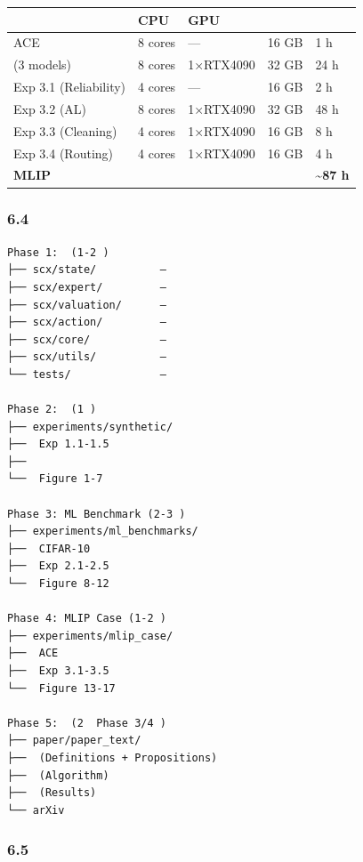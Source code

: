 \documentclass[
  12pt,
]{article}
\begin{document}
\begin{longtable}[]{@{}lllll@{}}
\toprule\noalign{}
 & CPU & GPU &  &  \\
\midrule\noalign{}
\endhead
\bottomrule\noalign{}
\endlastfoot
ACE  & 8 cores & --- & 16 GB & 1 h \\
 (3 models) & 8 cores & 1×RTX4090 & 32 GB & 24 h \\
Exp 3.1 (Reliability) & 4 cores & --- & 16 GB & 2 h \\
Exp 3.2 (AL) & 8 cores & 1×RTX4090 & 32 GB & 48 h \\
Exp 3.3 (Cleaning) & 4 cores & 1×RTX4090 & 16 GB & 8 h \\
Exp 3.4 (Routing) & 4 cores & 1×RTX4090 & 16 GB & 4 h \\
\textbf{MLIP } & & & & \textbf{\textasciitilde87 h} \\
\end{longtable}

\subsubsection{6.4
}\label{ux9879ux76eeux5f00ux53d1ux9636ux6bb5ux4e0eux65f6ux95f4ux7ebf}

\begin{verbatim}
Phase 1:  (1-2 )
├── scx/state/          — 
├── scx/expert/         — 
├── scx/valuation/      — 
├── scx/action/         — 
├── scx/core/           — 
├── scx/utils/          — 
└── tests/              — 

Phase 2:  (1 )
├── experiments/synthetic/
├──  Exp 1.1-1.5
├── 
└──  Figure 1-7

Phase 3: ML Benchmark (2-3 )
├── experiments/ml_benchmarks/
├──  CIFAR-10 
├──  Exp 2.1-2.5
└──  Figure 8-12

Phase 4: MLIP Case (1-2 )
├── experiments/mlip_case/
├──  ACE 
├──  Exp 3.1-3.5
└──  Figure 13-17

Phase 5:  (2  Phase 3/4 )
├── paper/paper_text/
├──  (Definitions + Propositions)
├──  (Algorithm)
├──  (Results)
└── arXiv 
\end{verbatim}

\subsubsection{6.5
}\label{ux5b9eux9a8cux8fd0ux884cux811aux672cux793aux4f8b}
\end{document}
